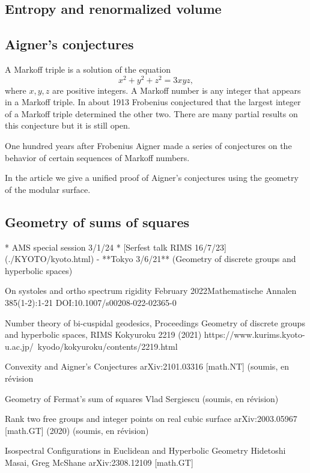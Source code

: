 \documentclass[12pt,a4paper]{amsart}
\begin{document}
\subsection{Entropy and renormalized volume}

\subsection{Aigner's conjectures}

A Markoff triple is a solution of the equation
$$x^2 + y^2 + z^2 = 3xyz,$$
where $x,y,z$ are positive integers.
A Markoff number is any integer that appears in a Markoff triple.
In about 1913 Frobenius conjectured that the largest integer of a
Markoff triple determined the other two. 
There are many partial results on this conjecture but it is still
open.


One hundred years after Frobenius Aigner made a series of
conjectures on the behavior of certain sequences of Markoff numbers.

In the article \cite{convexity} we give a unified proof of Aigner's
conjectures using the geometry of the modular surface.

\subsection{Geometry of sums of squares}

* AMS special session 3/1/24
* [Serfest talk RIMS 16/7/23](./KYOTO/kyoto.html)
- **Tokyo 3/6/21** (Geometry of discrete groups and hyperbolic spaces)


On systoles and ortho spectrum rigidity
February 2022Mathematische Annalen 385(1-2):1-21
DOI:10.1007/s00208-022-02365-0

Number theory of bi-cuspidal geodesics, 
 Proceedings Geometry of discrete groups and hyperbolic spaces,
 RIMS Kokyuroku 2219 (2021) 
	https://www.kurims.kyoto-u.ac.jp/~kyodo/kokyuroku/contents/2219.html

Convexity and Aigner's Conjectures 
	arXiv:2101.03316 [math.NT] (soumis, en révision

Geometry of Fermat’s sum of squares
Vlad Sergiescu (soumis, en révision)

Rank two free groups and integer points on real cubic surface
arXiv:2003.05967 [math.GT] (2020) (soumis, en révision) 

Isospectral Configurations in Euclidean and Hyperbolic Geometry
Hidetoshi Masai, Greg McShane 	arXiv:2308.12109 [math.GT]
\end{document}
